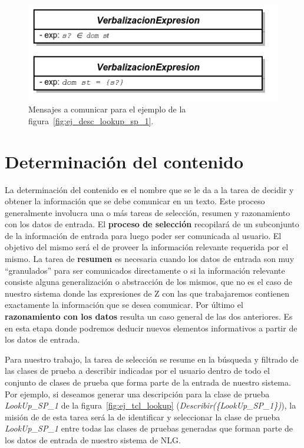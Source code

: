 \begin{figure}[H]
  	\centering
	\includegraphics[scale=0.4]{img/mensajes.png}
	\caption{Mensajes a comunicar para el ejemplo de la figura~\ref{fig:ej_desc_lookup_sp_1}.}
  	\label{fig:ej_mensajes}
\end{figure}



\section{Determinación del contenido}

La determinación del contenido es el nombre que se le da a la tarea de decidir y obtener la información que se debe comunicar en un texto. Este proceso generalmente involucra una o más tareas de selección, resumen y razonamiento con los datos de entrada. 
El \textbf{proceso de selección} recopilará de un subconjunto de la información de entrada para luego poder ser comunicada al usuario. El objetivo del mismo será el de proveer la información relevante requerida por el mismo.
La tarea de \textbf{resumen} es necesaria cuando los datos de entrada son muy ``granulados'' para ser comunicados directamente o si la información relevante consiste alguna generalización o abstracción de los mismos, que no es el caso de nuestro sistema donde las expresiones de Z con las que trabajaremos contienen exactamente la información que se desea comunicar.
Por último el \textbf{razonamiento con los datos} resulta un caso general de las dos anteriores. Es en esta etapa donde podremos deducir nuevos elementos informativos a partir de los datos de entrada. 

Para nuestro trabajo, la tarea de selección se resume en la búsqueda y filtrado de las clases de prueba a describir indicadas por el usuario dentro de todo el conjunto de clases de prueba que forma parte de la entrada de nuestro sistema. Por ejemplo, si deseamos generar una descripción para la clase de prueba \emph{LookUp\_SP\_1} de la figura~\ref{fig:ej_tcl_lookup} (\emph{Describir(\{LookUp\_SP\_1\})}), la misión de de esta tarea será la de identificar y seleccionar la clase de prueba \emph{LookUp\_SP\_1} entre todas las clases de pruebas generadas que forman parte de los datos de entrada de nuestro sistema de NLG.

